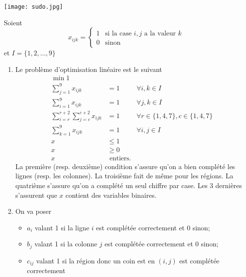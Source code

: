 \begin{enumerate}
\begin{enumerate}
        \begin{center}
          \texttt{[image: sudo.jpg]}
        \end{center}

    \end{enumerate}

    \begin{solution}
      Soient
      \[ x_{ijk} =
        \begin{cases}
          1 & \text{si la case }i, j\text{ a la valeur }k\\
          0 & \text{sinon}
        \end{cases}
      \]
      et $I = \{1,2,\ldots,9\}$
      \begin{enumerate}
        \item Le problème d'optimisation linéaire est le suivant
          \begin{align*}
            \min 1\\
            \sum_{j=1}^9 x_{ijk} & = 1 & \forall i,k \in I\\
            \sum_{i=1}^9 x_{ijk} & = 1 & \forall j,k \in I\\
            \sum_{i=r}^{r+2}\sum_{j=c}^{c+2} x_{ijk} & = 1
            & \forall r \in \{1,4,7\}, c \in \{1,4,7\}\\
            \sum_{k=1}^9 x_{ijk} & = 1 & \forall i,j \in I\\
            x & \leq 1\\
            x & \geq 0\\
            x & \text{ entiers}.
          \end{align*}
          La première (resp. deuxième) condition s'assure qu'on a bien complété
          les lignes (resp. les colonnes).
          La troisième fait de même pour les régions.
          La quatrième s'assure qu'on a complété un seul chiffre par
          case.
          Les 3 dernières s'assurent que $x$ contient des variables binaires.
        \item
          On va poser
          \begin{itemize}
            \item $a_i$ valant 1 si la ligne $i$ est complétée correctement
              et 0 sinon;
            \item $b_j$ valant 1 si la colonne $j$ est complétée correctement
              et 0 sinon;
            \item $c_{ij}$ valant 1 si la région donc un coin est en
              $(i,j)$ est complétée correctement

\end{itemize}
\end{enumerate}
\end{solution}
\end{enumerate}
